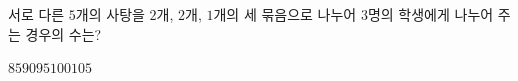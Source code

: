 \hspace*{2mm}\begin{minipage}[t]{\dimexpr\linewidth-2mm\relax}\vspace{0pt}
서로 다른 $5$개의 사탕을 $2$개, $2$개, $1$개의 세 묶음으로 나누어 $3$명의 학생에게 나누어 주는 경우의 수는?
\begin{choices32}{$85$}{$90$}{$95$}{$100$}{$105$}\end{choices32}\end{minipage}
